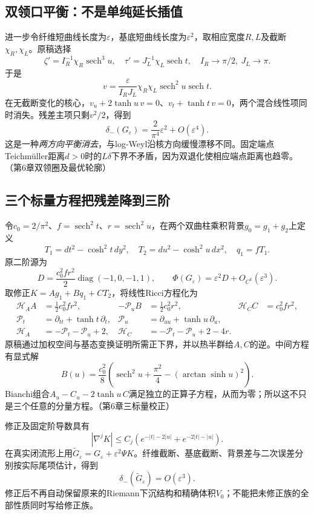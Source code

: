 \documentclass[UTF8,fontset=fandol,zihao=-4]{ctexart}
\theoremstyle{research}
\numberwithin{equation}{section}
\begin{document}
\subsection{双领口平衡：不是单纯延长插值}
进一步令纤维短曲线长度为$\varepsilon$，基底短曲线长度为$\varepsilon^2$，取相应宽度$R,L$及截断$\chi_R,\chi_L$。原稿选择
\[
\zeta'=I_R^{-1}\chi_R\operatorname{sech}^3u,
\quad \tau'=J_L^{-1}\chi_L\operatorname{sech}t,
\quad I_R\to\pi/2,\ J_L\to\pi.
\]
于是
\[
v=\frac{\varepsilon}{I_RJ_L}\chi_R\chi_L
\operatorname{sech}^2u\operatorname{sech}t.
\]
在无截断变化的核心，$v_u+2\tanh u\,v=0$、$v_t+\tanh t\,v=0$，两个混合线性项同时消失。残差主项只剩$v^2/2$，得到
\[
\delta_-(G_\varepsilon)=\frac{2}{\pi^4}\varepsilon^2+O(\varepsilon^4).
\]
这是一种\emph{两方向平衡消去}，与log-Weyl沿核方向缓慢漂移不同。固定端点Teichmüller距离$d>0$时的$L\delta$下界不矛盾，因为双退化使相应端点距离也趋零。\cite{L}（第6章双领圈及最优轮廓）

\subsection{三个标量方程把残差降到三阶}
令$c_0=2/\pi^2$、$f=\operatorname{sech}^2t$、$r=\operatorname{sech}^2u$，在两个双曲柱乘积背景$g_0=g_1+g_2$上定义
\[
T_1=dt^2-\cosh^2t\,dy^2,
\quad T_2=du^2-\cosh^2u\,dx^2,
\quad q_1=fT_1.
\]
原二阶源为
\[
D=\frac{c_0^2fr^2}{2}\operatorname{diag}(-1,0,-1,1),
\qquad\Phi(G_\varepsilon)=\varepsilon^2D+O_{C^k}(\varepsilon^3).
\]
取修正$K=A g_1+B q_1+C T_2$，将线性Ricci方程化为
\begin{align}
\mathcal H_AA&=\tfrac12c_0^2fr^2,&
-\mathcal P_uB&=\tfrac12c_0^2r^2,&
\mathcal H_CC&=c_0^2fr^2,\\
\mathcal P_t&=\partial_{tt}+\tanh t\,\partial_t,&
\mathcal P_u&=\partial_{uu}+\tanh u\,\partial_u,\\
\mathcal H_A&=-\mathcal P_t-\mathcal P_u+2,&
\mathcal H_C&=-\mathcal P_t-\mathcal P_u+2-4r.
\end{align}
原稿通过加权空间与基态变换证明所需正下界，并以热半群给$A,C$的逆。中间方程有显式解
\[
B(u)=\frac{c_0^2}{8}
\left(\operatorname{sech}^2u+\frac{\pi^2}{4}
-(\arctan\sinh u)^2\right).
\]
Bianchi组合$A_u-C_u-2\tanh u\,C$满足独立的正算子方程，从而为零；所以这不只是三个任意的分量方程。\cite{L}（第6章三标量校正）

修正及固定阶导数具有
\[
|\nabla^jK|\le C_j(e^{-|t|-2|u|}+e^{-2|t|-|u|}).
\]
在真实闭流形上用$\widetilde G_\varepsilon=G_\varepsilon+\varepsilon^2\Psi K$。纤维截断、基底截断、背景差与二次误差分别按实际尾项估计，得到
\[
\delta_-(\widetilde G_\varepsilon)=O(\varepsilon^3).
\]
修正后不再自动保留原来的Riemann下沉结构和精确体积$V_0$；不能把未修正族的全部性质同时写给修正族。
\end{document}
